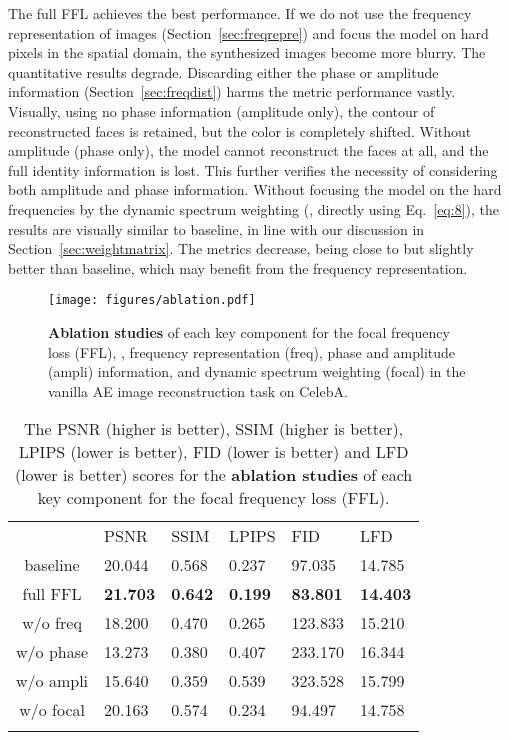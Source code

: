 \documentclass[10pt,twocolumn,letterpaper]{article}
\begin{document}
The full FFL achieves the best performance.
If we do not use the frequency representation of images (Section~\ref{sec:freqrepre}) and focus the model on hard pixels in the spatial domain, the synthesized images become more blurry. The quantitative results degrade.
Discarding either the phase or amplitude information (Section~\ref{sec:freqdist}) harms the metric performance vastly. Visually, using no phase information (amplitude only), the contour of reconstructed faces is retained, but the color is completely shifted. Without amplitude (phase only), the model cannot reconstruct the faces at all, and the full identity information is lost. This further verifies the necessity of considering both amplitude and phase information.
Without focusing the model on the hard frequencies by the dynamic spectrum weighting (\ie, directly using Eq.~\eqref{eq:8}), the results are visually similar to baseline, in line with our discussion in Section~\ref{sec:weightmatrix}. The metrics decrease, being close to but slightly better than baseline, which may benefit from the frequency representation.


\begin{figure}[t]
	\centering
\texttt{[image: figures/ablation.pdf]}
	\vspace{-0.5cm}
	\caption{\textbf{Ablation studies} of each key component for the focal frequency loss (FFL), \ie, frequency representation (freq), phase and amplitude (ampli) information, and dynamic spectrum weighting (focal) in the vanilla AE image reconstruction task on CelebA.}
	\label{fig:ablation}
	\vspace{-0.1cm}
\end{figure}


\begin{table}[tb!]
\centering
\footnotesize
\caption{The PSNR (higher is better), SSIM (higher is better), LPIPS (lower is better), FID (lower is better) and LFD (lower is better) scores for the \textbf{ablation studies} of each key component for the focal frequency loss (FFL).}
\begin{tabularx}{\linewidth}{c|*{5}{|Y}}
\Xhline{1pt}
 & PSNR& SSIM& LPIPS& FID& LFD \\
\Xhline{0.6pt}
baseline & 20.044& 0.568& 0.237& 97.035& 14.785 \\
full FFL & {\bf21.703}& {\bf0.642}& {\bf0.199}& {\bf83.801}& {\bf14.403} \\
\Xhline{0.4pt}
w/o freq & 18.200& 0.470& 0.265& 123.833& 15.210 \\
w/o phase & 13.273& 0.380& 0.407& 233.170& 16.344 \\
w/o ampli & 15.640& 0.359& 0.539& 323.528& 15.799 \\
w/o focal & 20.163& 0.574& 0.234& 94.497& 14.758 \\
\Xhline{1pt}
\end{tabularx}
\label{tbl:ablation}
\vspace{-0.55cm}
\end{table}
\end{document}
